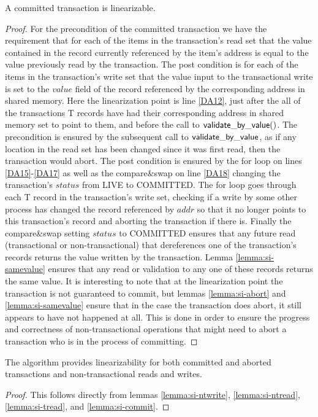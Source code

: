 \begin{lemma}
\label{lemma:si-commit}
A committed transaction is linearizable.
\end{lemma}
\begin{proof}
For the precondition of the committed transaction we have the requirement
that for each of the items in the transaction's read set that the value
contained in the record currently referenced by the item's address is equal to the value 
previously read by the transaction.
The post condition is for each of the items in the transaction's write set
that the value input to the transactional write is set to the $\mathit{value}$ field of the record
referenced by the corresponding address in shared memory.
Here the linearization point is line \ref{DA12}, just after the all of the transactions T records
have had their corresponding address in shared memory set to point to them, and before the call to
$\sf{validate\_by\_value}()$.
The precondition is ensured by the subsequent call to $\sf{validate\_by\_value}$,
as if any location in the read set has been changed since it was first read, then
the transaction would abort.
The post condition is ensured by the for loop on lines \ref{DA15}-\ref{DA17} as well
as the compare\&swap on line \ref{DA18} changing the transaction's $\mathit{status}$
from LIVE to COMMITTED.
The for loop goes through each T record in the transaction's write set, checking
if a write by some other process has changed the record referenced by $\mathit{addr}$ so that it no longer points
to this transaction's record and aborting the transaction
if there is.
Finally the compare\&swap setting $\mathit{status}$ to COMMITTED ensures
that any future read (transactional or non-transactional) that dereferences one of
the transaction's records returns the value written by the transaction.
Lemma \ref{lemma:si-samevalue} ensures that any read or validation to any one of these
records returns the same value.
It is interesting to note that at the linearization point the transaction is not
guaranteed to commit, but lemmas \ref{lemma:si-abort} and \ref{lemma:si-samevalue}
ensure that in the case the transaction does abort, it still appears to have not happened
at all.
This is done in order to ensure the progress and correctness of non-transactional operations that might
need to abort a transaction who is in the process of committing.
\end{proof}



\begin{theorem}
\label{theorem:si-lin}
The algorithm provides linearizability for both committed and aborted transactions
and non-transactional reads and writes.
\end{theorem}
\begin{proof}
This follows directly from lemmas \ref{lemma:si-ntwrite}, \ref{lemma:si-ntread}, \ref{lemma:si-tread},
and \ref{lemma:si-commit}.
\end{proof}



